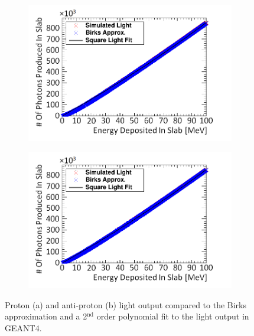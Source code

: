 \begin{figure}[!h]
\centering
\begin{subfigure}{.5\textwidth}
  \centering
  \includegraphics[width=\linewidth]{Chapter4/Figs/Raster/protonSimulatedLightNew.png}
  \captionsetup{width=.9\linewidth}
  \caption{}
  \label{subFig:proton_light}
\end{subfigure}%
\begin{subfigure}{.5\textwidth}
  \centering
  \includegraphics[width=\linewidth]{Chapter4/Figs/Raster/aProtonSimulatedLightNew.png}
  \captionsetup{width=.9\linewidth}
  \caption{}
  \label{subFig:aproton_light}
\end{subfigure}
\caption[Proton and anti-proton light output in GEANT4.]{Proton (a) and anti-proton (b) light output compared to the Birks approximation and a 2$^\textrm{nd}$ order polynomial fit to the light output in GEANT4.}
\label{fig:proton_aproton_light}
\end{figure}

